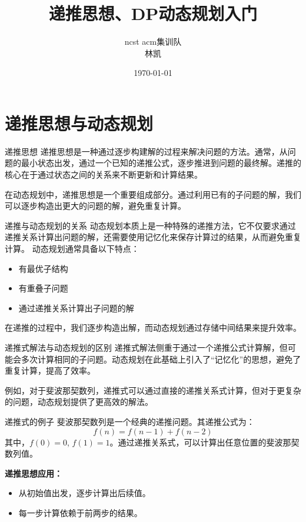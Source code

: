 \documentclass{beamer}
\title{递推思想、DP动态规划入门}
\author{ncst acm集训队\\ 林凯}
\date{\today}
\begin{document}
\frame{\titlepage}

\section{递推思想与动态规划}

\begin{frame}{递推思想}
    递推思想是一种通过逐步构建解的过程来解决问题的方法。通常，从问题的最小状态出发，通过一个已知的递推公式，逐步推进到问题的最终解。递推的核心在于通过状态之间的关系来不断更新和计算结果。
    
    在动态规划中，递推思想是一个重要组成部分。通过利用已有的子问题的解，我们可以逐步构造出更大的问题的解，避免重复计算。
\end{frame}

\begin{frame}{递推与动态规划的关系}
    动态规划本质上是一种特殊的递推方法，它不仅要求通过递推关系计算出问题的解，还需要使用记忆化来保存计算过的结果，从而避免重复计算。
    动态规划通常具备以下特点：
    \begin{itemize}
        \item 有最优子结构
        \item 有重叠子问题
        \item 通过递推关系计算出子问题的解
    \end{itemize}
    
    在递推的过程中，我们逐步构造出解，而动态规划通过存储中间结果来提升效率。
\end{frame}

\begin{frame}{递推式解法与动态规划的区别}
    递推式解法侧重于通过一个递推公式计算解，但可能会多次计算相同的子问题。动态规划在此基础上引入了“记忆化”的思想，避免了重复计算，提高了效率。
    
    例如，对于斐波那契数列，递推式可以通过直接的递推关系式计算，但对于更复杂的问题，动态规划提供了更高效的解法。
\end{frame}

\begin{frame}{递推式的例子}
    斐波那契数列是一个经典的递推问题。其递推公式为：
    \[
    f(n) = f(n-1) + f(n-2)
    \]
    其中，$f(0) = 0$, $f(1) = 1$。通过递推关系式，可以计算出任意位置的斐波那契数列值。
    
    \textbf{递推思想应用：}
    \begin{itemize}
        \item 从初始值出发，逐步计算出后续值。
        \item 每一步计算依赖于前两步的结果。
    \end{itemize}
\end{frame}
\end{document}
